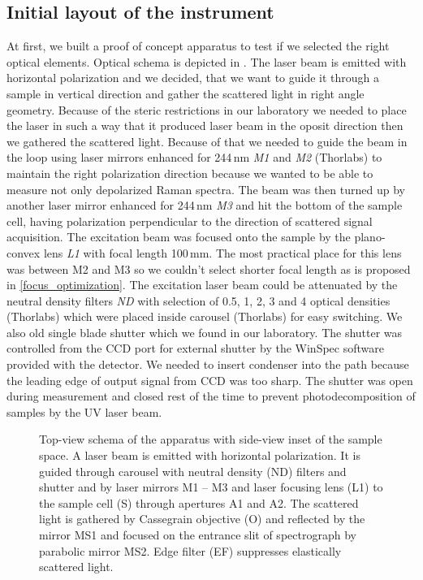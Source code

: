 \subsection{Initial layout of the instrument}

At first, we built a proof of concept apparatus to test if we selected the
right optical elements. Optical schema is depicted in
.
The laser beam is emitted with horizontal polarization and we decided, that we
want to guide it through a sample in vertical direction and gather the
scattered light in right angle geometry. Because of the steric restrictions in
our laboratory we needed to place the laser in such a way that it produced
laser beam in the oposit direction then we gathered the scattered light.
Because of that we needed to guide the beam in the loop using laser mirrors
enhanced for 244\,nm \emph{M1} and \emph{M2} (Thorlabs) to maintain the right
polarization direction because we wanted to be able to measure not only
depolarized Raman spectra. The beam was then turned up by another laser mirror
enhanced for 244\,nm \emph{M3} and hit the bottom of the sample cell, having
polarization perpendicular to the direction of scattered signal acquisition.
The excitation beam was focused onto the sample by the plano-convex lens
\emph{L1} with focal length 100\,mm. The most practical place for this lens
was between M2 and M3 so we couldn't select shorter focal length as is proposed
in \cref{focus_optimization}. The excitation laser beam could be attenuated by
the neutral density filters \emph{ND} with selection of 0.5, 1, 2, 3 and 4
optical densities (Thorlabs) which were placed inside carousel (Thorlabs) for
easy switching. We also old single blade shutter which we found in our
laboratory. The shutter was controlled from the CCD port for external shutter
by the WinSpec software provided with the detector. We needed to insert
condenser into the path because the leading edge of output signal from CCD was
too sharp. The shutter was open during measurement and closed rest of the time
to prevent photodecomposition of samples by the UV laser beam.

\begin{figure}
	\centering
	
	\caption{Top-view schema of the apparatus with side-view inset of the sample
		space. A laser beam is emitted with horizontal polarization. It is guided
		through carousel with neutral density (ND) filters and shutter and by laser
		mirrors M1 -- M3 and laser focusing lens (L1) to the sample cell (S)
		through apertures A1 and A2. The scattered light is gathered by Cassegrain
		objective (O) and reflected by the mirror MS1 and focused on the entrance
		slit of spectrograph by parabolic mirror MS2. Edge filter (EF) suppresses
		elastically scattered light.}
	\label{\figlabel{initial_layout:apparatus_schema}}
\end{figure}

